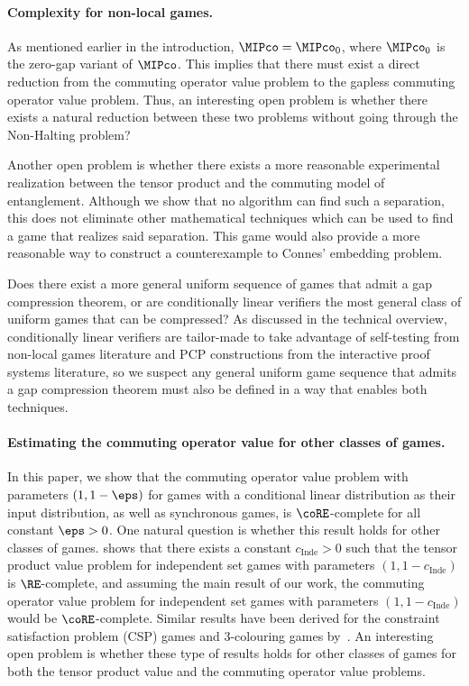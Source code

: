 \paragraph{Complexity for non-local games. } As mentioned earlier in the introduction, $\MIPco=\MIPco_0$, where $\MIPco_0$ is the zero-gap variant of $\MIPco$. This implies that there must exist a direct reduction from the commuting operator value problem to the gapless commuting operator value problem. Thus, an interesting open problem is whether there exists a natural reduction between these two problems without going through the Non-Halting problem?

Another open problem is whether there exists a more reasonable experimental realization between the tensor product and the commuting model of entanglement. Although we show that no algorithm can find such a separation, this does not eliminate other mathematical techniques which can be used to find a game that realizes said separation. This game would also provide a more reasonable way to construct a counterexample to Connes' embedding problem. 

Does there exist a more general uniform sequence of games that admit a gap compression theorem, or are conditionally linear verifiers the most general class of uniform games that can be compressed? As discussed in the technical overview, conditionally linear verifiers are tailor-made to take advantage of self-testing from non-local games literature and PCP constructions from the interactive proof systems literature, so we suspect any general uniform game sequence that admits a gap compression theorem must also be defined in a way that enables both techniques.

\paragraph{Estimating the commuting operator value for other classes of games. } In this paper, we show that the commuting operator value problem with parameters $(1, 1- \eps)$ for games with a conditional linear distribution as their input distribution, as well as synchronous games, is $\coRE$-complete for all constant $\eps > 0$. One natural question is whether this result holds for other classes of games. \cite{mancinskaGappreservingReductionsREcompleteness2025} shows that there exists a constant $c_{\text{Inde}} > 0$ such that the tensor product value problem for independent set games with parameters $(1, 1 - c_{\text{Inde}})$ is $\RE$-complete, and assuming the main result of our work,  the commuting operator value problem for independent set games with parameters $(1, 1 - c_{\text{Inde}})$ would be $\coRE$-complete. Similar results have been derived for the constraint satisfaction problem (CSP) games and 3-colouring games by~\cite{culfREcompletenessEntangledConstraint2025}. An interesting open problem is whether these type of results holds for other classes of games for both the tensor product value and the commuting operator value problems.

